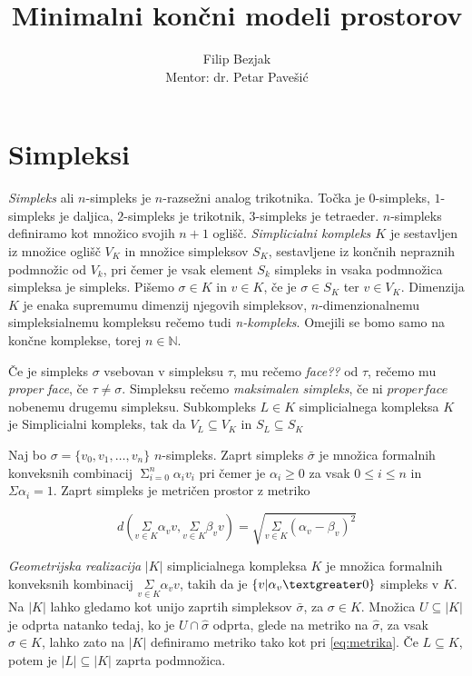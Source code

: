 \documentclass[a4paper,12pt]{article}
\title{Minimalni končni modeli prostorov}
\author{Filip Bezjak \\ Mentor: dr. Petar Pavešić}
\newcommand\mymathop[1]{\mathop{\operatorname{#1}}}
\theoremstyle{definition}
\theoremstyle{plain}
\theoremstyle{plain}
\theoremstyle{definition}
\theoremstyle{plain}
\theoremstyle{plain}
\begin{document}
\maketitle


\section{Simpleksi}

    \textit{Simpleks} ali $n$-simpleks je $n$-razsežni analog trikotnika. Točka je $0$-simpleks, $1$-simpleks je daljica, $2$-simpleks je trikotnik,
$3$-simpleks je tetraeder. $n$-simpleks definiramo kot množico svojih $n+1$ oglišč. \textit{Simplicialni kompleks $K$} je sestavljen iz množice oglišč $V_K$ in množice simpleksov $S_K$, sestavljene iz končnih nepraznih podmnožic od $V_k$, pri čemer je vsak element $S_k$ simpleks in vsaka podmnožica simpleksa je simpleks. Pišemo $\sigma \in K$ in $v \in K$, če je $\sigma \in S_K$ ter $v \in V_K$. Dimenzija $K$ je enaka supremumu dimenzij njegovih simpleksov, $n$-dimenzionalnemu simpleksialnemu kompleksu rečemo tudi \textit{n-kompleks}. Omejili se bomo samo na končne komplekse, torej $n \in \mathbb{N}$.

Če je simpleks $\sigma$ vsebovan  v simpleksu $\tau$, mu rečemo \textit{face??} od $\tau$, rečemo mu \textit{proper face}, če $\tau\neq \sigma$. Simpleksu rečemo \textit{maksimalen simpleks}, če ni $proper face$ nobenemu drugemu simpleksu. Subkompleks $L\in K$ simplicialnega kompleksa $K$ je Simplicialni kompleks, tak da $V_L\subseteq V_K$ in $S_L\subseteq S_K$


Naj bo $\sigma = \{v_0,v_1,\ldots,v_n\}$ $n$-simpleks. Zaprt
simpleks $\bar{\sigma}$ je množica formalnih konveksnih combinacij $\mymathop{\Sigma}_{i=0}^{n}\alpha_i v_i$
pri čemer je $\alpha_i \ge 0$ za vsak $0\le i \le n$ in $\Sigma \alpha_i = 1$. Zaprt simpleks je metričen prostor z metriko

\begin{equation}
\label{eq:metrika}
d(\underset{v \in K}{\Sigma}\alpha_v v,\underset{v \in K}{\Sigma}\beta_v v) = \sqrt{\underset{v \in K}{\Sigma}(\alpha_v - \beta_v)^2}
\end{equation}

\textit{Geometrijska realizacija} $|K|$ simplicialnega kompleksa $K$ je 
množica formalnih konveksnih kombinacij $\underset{v \in K}{\Sigma}\alpha_v v$, takih da je $\{v | \alpha_v \textgreater 0\}$ simpleks v $K$.
Na $|K|$ lahko gledamo kot unijo zaprtih simpleksov $\bar{\sigma}$, za $\sigma \in K$. Množica $U\subseteq |K|$ je odprta natanko tedaj, ko je $U \cap \hat{\sigma}$ odprta, glede na metriko na $\hat{\sigma}$, za vsak $\sigma \in K$, lahko zato na $|K|$ definiramo metriko tako kot pri \ref{eq:metrika}. Če $L\subseteq K$, potem je $|L|\subseteq |K|$ zaprta podmnožica.
\end{document}
